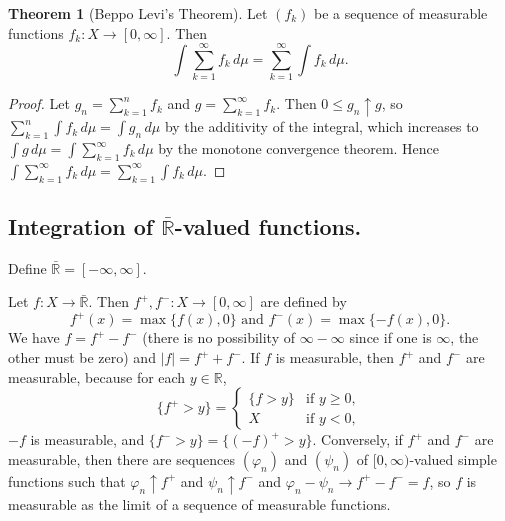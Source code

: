 \documentclass{article}
\newcommand{\R}{\mathbb{R}}
\theoremstyle{definition}
\newtheorem{theorem}{Theorem}
\begin{document}
\begin{theorem}[Beppo Levi's Theorem]
Let $(f_k)$ be a sequence of measurable functions $f_k : X \longrightarrow [0, \infty]$. Then
\[
    \int \sum_{k=1}^\infty f_k \,d\mu = \sum_{k=1}^\infty \int f_k \,d\mu.
\]
\end{theorem}
\begin{proof}
    Let $g_n = \sum_{k=1}^n f_k$ and $g = \sum_{k=1}^\infty f_k$. Then $0 \leq g_n \uparrow g$, so $\sum_{k=1}^n \int f_k\,d\mu = \int g_n\,d\mu$ by the additivity of the integral, which increases to $\int g\,d\mu = \int \sum_{k=1}^\infty f_k\,d\mu$ by the monotone convergence theorem. Hence $\int \sum_{k=1}^\infty f_k \,d\mu = \sum_{k=1}^\infty \int f_k \,d\mu$.
\end{proof}

\subsection*{Integration of $\bar{\R}$-valued functions.}
Define $\bar{\R} = [-\infty, \infty]$.

Let $f:X\longrightarrow \bar{\R}$. Then $f^+, f^- : X \longrightarrow [0, \infty]$ are defined by
\[
    f^+(x) = \max\{f(x), 0\}  \text{ and } f^-(x) = \max\{-f(x), 0\}.
\]
We have $f = f^+ - f^-$ (there is no possibility of $\infty - \infty$ since if one is $\infty$, the other must be zero) and $|f| = f^+ + f^-$.
If $f$ is measurable, then $f^+$ and $f^-$ are measurable, because for each $y \in \R$,
\[
    \{f^+ > y\} = \begin{cases}
        \{f > y\} & \text{if } y \geq 0, \\
        X & \text{if } y < 0,
    \end{cases}
\]
$-f$ is measurable, and $\{f^- > y\} = \{(-f)^+ > y\}$.
Conversely, if $f^+$ and $f^-$ are measurable, then there are sequences $(\varphi_n)$ and $(\psi_n)$ of $[0, \infty)$-valued simple functions such that $\varphi_n \uparrow f^+$ and $\psi_n \uparrow f^-$ and $\varphi_n - \psi_n \to f^+ - f^- = f$, so $f$ is measurable as the limit of a sequence of measurable functions.
\end{document}
